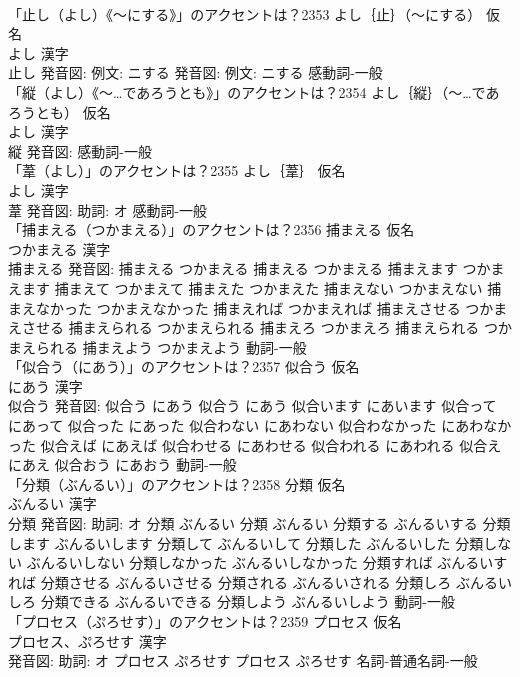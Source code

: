 \documentclass[8pt]{extreport}
\begin{document}
\begin{CJK}{UTF8}{min}
\\	「止し（よし）《〜にする》」のアクセントは？2353	よし｛止｝（〜にする） 仮名　
\\	よし 漢字　
\\	止し 発音図: 例文: ニする 発音図: 例文: ニする							感動詞-一般 
\\	「縦（よし）《〜…であろうとも》」のアクセントは？2354	よし｛縦｝（〜…であろうとも） 仮名　
\\	よし 漢字　
\\	縦 発音図:							感動詞-一般 
\\	「葦（よし）」のアクセントは？2355	よし｛葦｝ 仮名　
\\	よし 漢字　
\\	葦 発音図: 助詞: オ							感動詞-一般 
\\	「捕まえる（つかまえる）」のアクセントは？2356	捕まえる 仮名　
\\	つかまえる 漢字　
\\	捕まえる 発音図:	捕まえる つかまえる		捕まえる つかまえる 捕まえます つかまえます 捕まえて つかまえて 捕まえた つかまえた 捕まえない つかまえない 捕まえなかった つかまえなかった 捕まえれば つかまえれば 捕まえさせる つかまえさせる 捕まえられる つかまえられる 捕まえろ つかまえろ 捕まえられる つかまえられる 捕まえよう つかまえよう				動詞-一般 
\\	「似合う（にあう）」のアクセントは？2357	似合う 仮名　
\\	にあう 漢字　
\\	似合う 発音図:	似合う にあう		似合う にあう 似合います にあいます 似合って にあって 似合った にあった 似合わない にあわない 似合わなかった にあわなかった 似合えば にあえば 似合わせる にあわせる 似合われる にあわれる 似合え にあえ 似合おう にあおう				動詞-一般 
\\	「分類（ぶんるい）」のアクセントは？2358	分類 仮名　
\\	ぶんるい 漢字　
\\	分類 発音図: 助詞: オ	分類 ぶんるい		分類 ぶんるい 分類する ぶんるいする 分類します ぶんるいします 分類して ぶんるいして 分類した ぶんるいした 分類しない ぶんるいしない 分類しなかった ぶんるいしなかった 分類すれば ぶんるいすれば 分類させる ぶんるいさせる 分類される ぶんるいされる 分類しろ ぶんるいしろ 分類できる ぶんるいできる 分類しよう ぶんるいしよう				動詞-一般 
\\	「プロセス（ぷろせす）」のアクセントは？2359	プロセス 仮名　
\\	プロセス、ぷろせす 漢字　
\\	発音図: 助詞: オ	プロセス ぷろせす		プロセス ぷろせす				名詞-普通名詞-一般 

\end{CJK}
\end{document}
